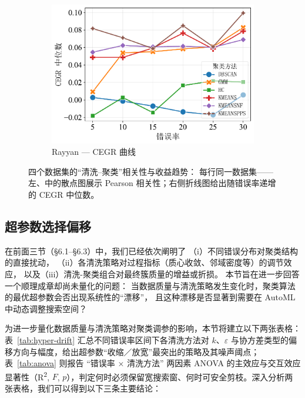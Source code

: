 \documentclass[10pt]{article} %
\numberwithin{equation}{section}
\begin{document}
\begin{figure}[htbp]
\begin{subfigure}[b]{0.33\linewidth}
    \includegraphics[width=\linewidth]{figures/6.4.3graph/CEGR_5pct_rayyan.pdf}
    \caption{Rayyan — CEGR 曲线}
    \label{fig:ra_cegr}
  \end{subfigure}

  \caption{四个数据集的“清洗–聚类”相关性与收益趋势：  
           每行同一数据集——左、中的散点图展示 Pearson 相关性；右侧折线图给出随错误率递增的 CEGR 中位数。}
  \label{fig:scatter_line_grid}
\end{figure}


\subsection{超参数选择偏移}
\label{subsec:param_shift}

在前面三节（§6.1–§6.3）中，我们已经依次阐明了
（i）不同错误分布对聚类结构的直接扰动，
（ii）各清洗策略对过程指标（质心收敛、邻域密度等）的调节效应，
以及（iii）清洗-聚类组合对最终簇质量的增益或折损。
本节旨在进一步回答一个顺理成章却尚未量化的问题：  
\textcolor[rgb]{0.00,0.07,1.00}{当数据质量与清洗策略发生变化时，聚类算法的最优超参数会否出现系统性的“漂移”，
且这种漂移是否显著到需要在 AutoML 中动态调整搜索空间？}

为进一步量化数据质量与清洗策略对聚类调参的影响，本节将建立以下两张表格：表~\ref{tab:hyper-drift} 汇总不同错误率区间下各清洗方法对 $k$、$\varepsilon$ 与协方差类型的偏移方向与幅度，给出超参数“收缩／放宽”最突出的策略及其噪声阈点；表~\ref{tab:anova} 则报告 “错误率 × 清洗方法” 两因素 ANOVA 的主效应与交互效应显著性（R\textsuperscript{2}, $F$, $p$），判定何时必须保留宽搜索窗、何时可安全剪枝。深入分析两张表格，我们可以得到以下三条主要结论：
\end{document}
